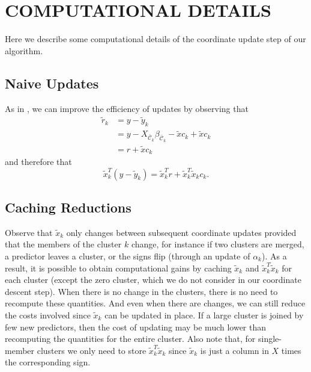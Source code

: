 \section{COMPUTATIONAL DETAILS}

\label{sec:computational-details}

Here we describe some computational details of the coordinate update step of our algorithm.

\subsection{Naive Updates}

As in \textcite{friedman2010}, we can improve the efficiency of updates by observing that
\begin{equation*}
  \begin{aligned}
    \tilde r_k & = y - \tilde y_k                                                                       \\
               & = y - X_{\bar{\mathcal{C}}_k}\beta_{\bar{\mathcal{C}}_k} - \tilde x c_k + \tilde x c_k \\
               & = r + \tilde x c_k
  \end{aligned}
\end{equation*}
and therefore that
\begin{equation}
  \label{eq:naive-update}
  \tilde x_k^T (y - \tilde y_k) = \tilde x_k^T r + \tilde x_k^T \tilde x_k c_k.
\end{equation}

\subsection{Caching Reductions}

Observe that \(\tilde x_k\) only changes between subsequent coordinate updates provided that the members of the cluster \(k\) change, for instance if two clusters are merged, a predictor leaves a cluster, or the signs flip (through an update of \(\alpha_k\)).
As a result, it is possible to obtain computational gains by caching \(\tilde x_k\) and \(\tilde x_k^T \tilde x_k\) for each cluster (except the zero cluster, which we do not consider in our coordinate descent step).
When there is no change in the clusters, there is no need to recompute these quantities.
And even when there are changes, we can still reduce the costs involved since \(\tilde x_k\) can be updated in place.
If a large cluster is joined by few new predictors, then the cost of updating may be much lower than recomputing the quantities for the entire cluster.
Also note that, for single-member clusters we only need to store \(\tilde x_k^T \tilde x_k\) since \(\tilde x_k\) is just a column in \(X\) times the corresponding sign.

